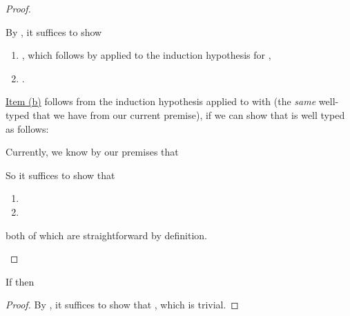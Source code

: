 {\begin{proof}
\begin{proofcases}
      By , it suffices to show
      \begin{enumerate}[leftmargin=*]
      \item
        \im{\styjudg{\anfh{\slenv},\edefs{\seone}}{\ehole{\seone}}{\anfh{\anfh{\sA}}}},
        which follows by  applied to the induction
        hypothesis for \im{\styjudg{\slenv}{\seone}{\sA}},
      \item \label{prf:anf:type-pres:let-1} \im{\styjudg{\anfh{\slenv},\edefs{\seone},\txone=\ehole{\seone}}{\anf{\setwo}{\tK}}{\tB}}.
      \end{enumerate}

      \hyperref[prf:anf:type-pres:let-1]{Item (b)} follows from the
      induction hypothesis applied to
      \im{\styjudg{\slenv,\sx=\seone}{\setwo}{\sBpr}} with \im{\tK} (the \emph{same}
      well-typed \im{\tK} that we have from our current premise), if we can show
      that \im{\tK} is well typed as follows:

      \im{\styjudg{\anfh{\slenv},\edefs{\seone},\txone=\ehole{\seone},\edefs{\setwo}}{\tK}{(\ehole{\setwo} : \anfh{\subst{\sBpr}{\seone}{\sxone}}) \Rightarrow \tB}}

      Currently, we know by our premises that

      \im{\styjudg{\anfh{\slenv},\edefs{\slete{\sxone}{\seone}{\setwo}}}{\tK}{(\ehole{\slete{\sxone}{\seone}{\setwo}} : \anfh{\subst{\sBpr}{\seone}{\sxone}}) \Rightarrow \tB}}

      So it suffices to show that
      \begin{enumerate}[leftmargin=*]
      \item \im{\edefs{\slete{\sxone}{\seone}{\setwo}} =
        (\edefs{\seone},\txone=\ehole{\seone},\edefs{\setwo})}
      \item \im{\ehole{\slete{\sxone}{\seone}{\setwo}} = \ehole{\setwo}}
      \end{enumerate}

      both of which are straightforward by definition.
  \end{proofcases}
\end{proof}

\begin{theorem}
  \label{thm:anf:type-pres}
  If \im{\styjudg{\slenv}{\se}{\sA}} then \im{\styjudg{\anfh{\slenv}}{\anfh{\se}}{\anfh{\sA}}}
\end{theorem}
\begin{proof}
  By , it suffices to show that
  \im{\styjudg{\anfh{\slenv}}{\hole}{(\_ : \anfh{\sA}) \Rightarrow \anfh{\sA}}}, which is trivial.
\end{proof}

}
